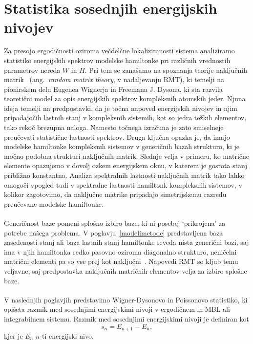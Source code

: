\section{Statistika sosednjih energijskih nivojev}
\label{statistika_sosednjih_nivojev}
Za presojo ergodičnosti oziroma večdelčne lokaliziranosti sistema analiziramo statistiko energijskih spektrov modelske hamiltonke pri različnih vrednostih parametrov nereda $W$ in $H$. Pri tem se zanašamo na spoznanja teorije naključnih matrik~\cite{mehta2004random} (ang.~\emph{random matrix theory}, v nadaljevanju RMT), ki temelji na pionirskem delu Eugenea Wignerja in Freemana J. Dysona, ki sta razvila teoretični model za opis energijskih spektrov kompleksnih atomskih jeder. Njuna ideja temelji na predpostavki, da je točna napoved energijskih nivojev in njim pripadajočih lastnih stanj v kompleksnih sistemih, kot so jedra težkih elementov, tako rekoč brezupna naloga. Namesto točnega izračuna je zato smiselneje preučevati statistične lastnosti spektrov. Druga ključna opazka je, da imajo modelske hamiltonke kompleksnih sistemov v generičnih bazah strukturo, ki je močno podobna strukturi naključnih matrik. Slednje velja v primeru, ko matrične elemente opazujemo v dovolj ozkem energijskem oknu, v katerem je gostota stanj približno konstantna. Analiza spektralnih lastnosti naključnih matrik tako lahko omogoči vpogled tudi v spektralne lastnosti hamiltonk kompleksnih sistemov, v kolikor zagotovimo, da naključne matrike pripadajo simetrijskemu razredu preučevane modelske hamiltonke. \\\\
 Generičnost baze pomeni splošno izbiro baze, ki ni posebej `prikrojena' za potrebe našega problema. V poglavju~\ref{modelimetode} predstavljena baza zasedenosti stanj ali baza lastnih stanj hamiltonke seveda nista generični bazi, saj ima v njih hamiltonka redko pasovno oziroma diagonalno strukturo, neničelni matrični elementi pa so vse prej kot naključni~\cite{d2016quantum}. Napovedi RMT so kljub temu veljavne, saj predpostavka naključnih matričnih elementov velja za izbiro splošne baze. \\\\
 V naslednjih poglavjih predstavimo Wigner-Dysonovo in Poissonovo statistiko, ki opišeta razmik med sosednjimi energijskimi nivoji v ergodičnem in MBL ali integrabilnem sistemu. Razmik med sosednjimi energijskimi nivoji je definiran kot 
 \begin{equation}\label{eq:razmik}
 s_n=E_{n+1}-E_n,
 \end{equation}
 kjer je $E_n$ $n$-ti energijski nivo. \\\\

